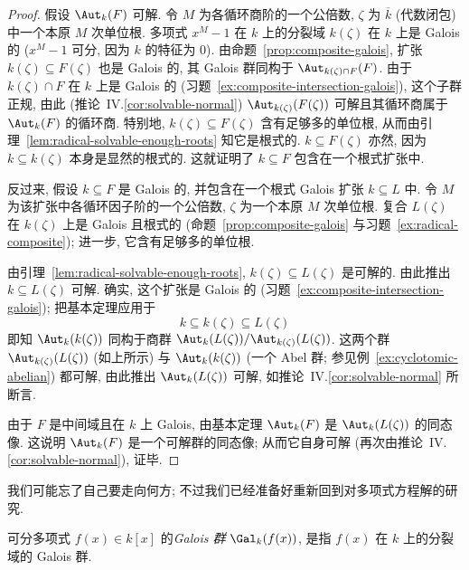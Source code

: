 \begin{proof}
假设 $\Aut_k(F)$ 可解. 令 $M$ 为各循环商阶的一个公倍数, $\zeta$ 为 $\overline{k}$ (代数闭包) 中一个本原 $M$ 次单位根. 多项式 $x^M-1$ 在 $k$ 上的分裂域 $k(\zeta)$ 在 $k$ 上是 Galois 的 ($x^M-1$ 可分, 因为 $k$ 的特征为 $0$). 由命题~\ref{prop:composite-galois}, 扩张 $k(\zeta)\subseteq F(\zeta)$ 也是 Galois 的, 其 Galois 群同构于 $\Aut_{k(\zeta)\cap F}(F)$. 由于 $k(\zeta)\cap F$ 在 $k$ 上是 Galois 的 (习题~\ref{ex:composite-intersection-galois}), 这个子群正规, 由此 (推论~IV.\ref{cor:solvable-normal}) $\Aut_{k(\zeta)}(F(\zeta))$ 可解且其循环商属于 $\Aut_k(F)$ 的循环商. 特别地, $k(\zeta)\subseteq F(\zeta)$ 含有足够多的单位根, 从而由引理~\ref{lem:radical-solvable-enough-roots} 知它是根式的. $k\subseteq F(\zeta)$ 亦然, 因为 $k\subseteq k(\zeta)$ 本身是显然的根式的. 这就证明了 $k\subseteq F$ 包含在一个根式扩张中.

反过来, 假设 $k\subseteq F$ 是 Galois 的, 并包含在一个根式 Galois 扩张 $k\subseteq L$ 中. 令 $M$ 为该扩张中各循环因子阶的一个公倍数, $\zeta$ 为一个本原 $M$ 次单位根. 复合 $L(\zeta)$ 在 $k(\zeta)$ 上是 Galois 且根式的 (命题~\ref{prop:composite-galois} 与习题~\ref{ex:radical-composite}); 进一步, 它含有足够多的单位根.

由引理~\ref{lem:radical-solvable-enough-roots}, $k(\zeta)\subseteq L(\zeta)$ 是可解的. 由此推出 $k\subseteq L(\zeta)$ 可解. 确实, 这个扩张是 Galois 的 (习题~\ref{ex:composite-intersection-galois}); 把基本定理应用于
\[
k\subseteq k(\zeta)\subseteq L(\zeta)
\]
即知 $\Aut_k(k(\zeta))$ 同构于商群 $\Aut_k(L(\zeta))/\Aut_{k(\zeta)}(L(\zeta))$. 这两个群 $\Aut_{k(\zeta)}(L(\zeta))$ (如上所示) 与 $\Aut_k(k(\zeta))$ (一个 Abel 群; 参见例~\ref{ex:cyclotomic-abelian}) 都可解, 由此推出 $\Aut_k(L(\zeta))$ 可解, 如推论~IV.\ref{cor:solvable-normal} 所断言.

由于 $F$ 是中间域且在 $k$ 上 Galois, 由基本定理 $\Aut_k(F)$ 是 $\Aut_k(L(\zeta))$ 的同态像. 这说明 $\Aut_k(F)$ 是一个可解群的同态像; 从而它自身可解 (再次由推论~IV.\ref{cor:solvable-normal}), 证毕.
\end{proof}

我们可能忘了自己要走向何方; 不过我们已经准备好重新回到对多项式方程解的研究.

\begin{definition}\label{def:galois-group-poly}
可分多项式 $f(x)\in k[x]$ 的\emph{Galois 群} $\Gal_k(f(x))$, 是指 $f(x)$ 在 $k$ 上的分裂域的 Galois 群.
\end{definition}

